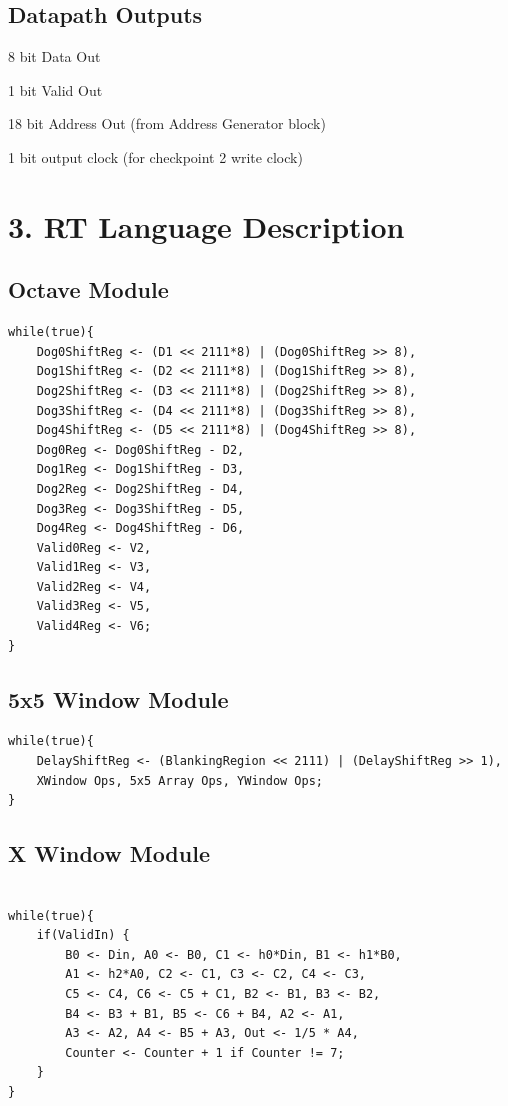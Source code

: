 \documentclass[11pt]{article}
\begin{document}
\subsection*{Datapath Outputs}

8 bit Data Out

1 bit Valid Out

18 bit Address Out (from Address Generator block)

1 bit output clock (for checkpoint 2 write clock)

\section*{3. RT Language Description}

\subsection*{Octave Module}
\begin{lstlisting}
while(true){
    Dog0ShiftReg <- (D1 << 2111*8) | (Dog0ShiftReg >> 8),
    Dog1ShiftReg <- (D2 << 2111*8) | (Dog1ShiftReg >> 8),
    Dog2ShiftReg <- (D3 << 2111*8) | (Dog2ShiftReg >> 8),
    Dog3ShiftReg <- (D4 << 2111*8) | (Dog3ShiftReg >> 8),
    Dog4ShiftReg <- (D5 << 2111*8) | (Dog4ShiftReg >> 8),
    Dog0Reg <- Dog0ShiftReg - D2,
    Dog1Reg <- Dog1ShiftReg - D3,
    Dog2Reg <- Dog2ShiftReg - D4,
    Dog3Reg <- Dog3ShiftReg - D5,
    Dog4Reg <- Dog4ShiftReg - D6,
    Valid0Reg <- V2,
    Valid1Reg <- V3,
    Valid2Reg <- V4,
    Valid3Reg <- V5,
    Valid4Reg <- V6;
}
\end{lstlisting}

\subsection*{5x5 Window Module}
\begin{lstlisting}
while(true){
    DelayShiftReg <- (BlankingRegion << 2111) | (DelayShiftReg >> 1),
    XWindow Ops, 5x5 Array Ops, YWindow Ops;
}
\end{lstlisting}

\subsection*{X Window Module}
\begin{lstlisting}

while(true){
    if(ValidIn) {
        B0 <- Din, A0 <- B0, C1 <- h0*Din, B1 <- h1*B0, 
        A1 <- h2*A0, C2 <- C1, C3 <- C2, C4 <- C3, 
        C5 <- C4, C6 <- C5 + C1, B2 <- B1, B3 <- B2, 
        B4 <- B3 + B1, B5 <- C6 + B4, A2 <- A1, 
        A3 <- A2, A4 <- B5 + A3, Out <- 1/5 * A4, 
        Counter <- Counter + 1 if Counter != 7;
    }
}
\end{lstlisting}
\end{document}
